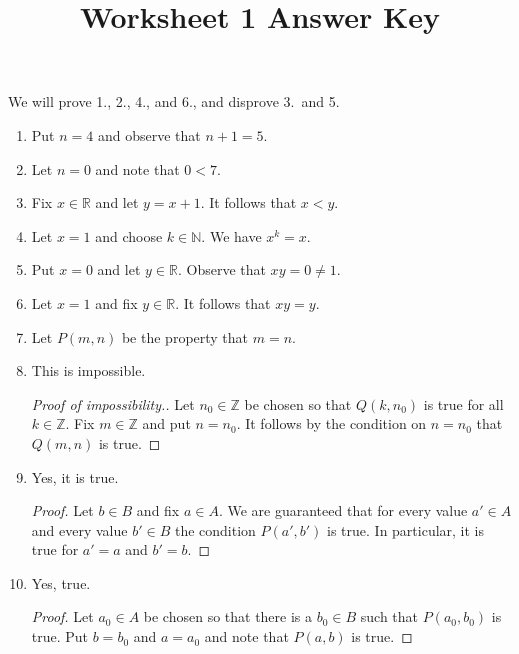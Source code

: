 \documentclass{article}
\title{Worksheet 1 Answer Key}
\author{}\date{}
\newcommand{\R}{\mathbb{R}}
\newcommand{\Z}{\mathbb{Z}}
\newcommand{\N}{\mathbb{N}}
\begin{document}
\maketitle

\noindent
We will prove 1., 2., 4., and 6., and disprove 3.\ and 5.

\begin{enumerate}
	\item Put $n=4$ and observe that $n+1=5$.
	\item Let $n=0$ and note that $0<7$.
	\item Fix $x\in\R$ and let $y=x+1$. It follows that $x<y$.
	\item Let $x=1$ and choose $k\in\N$. We have $x^k=x$.
	\item Put $x=0$ and let $y\in\R$. Observe that $xy=0\neq 1$.
	\item Let $x=1$ and fix $y\in\R$. It follows that $xy=y$.
	\item Let $P(m,n)$ be the property that $m=n$.
	\item This is impossible.
		
		\begin{proof}[Proof of impossibility.]
			Let $n_0\in\Z$ be chosen so that $Q(k,n_0)$ is true for all $k\in\Z$. Fix $m\in\Z$ and put $n=n_0$. It follows by the condition on $n=n_0$ that $Q(m,n)$ is true.
		\end{proof}

	\item Yes, it is true.

		\begin{proof}
			Let $b\in B$ and fix $a\in A$. We are guaranteed that for every value $a'\in A$ and every value $b'\in B$ the condition $P(a',b')$ is true. In particular, it is true for $a'=a$ and $b'=b$.
		\end{proof}

	\item Yes, true.

		\begin{proof}
			Let $a_0\in A$ be chosen so that there is a $b_0\in B$ such that $P(a_0,b_0)$ is true. Put $b=b_0$ and $a=a_0$ and note that $P(a,b)$ is true.
		\end{proof}
\end{enumerate}
\end{document}
